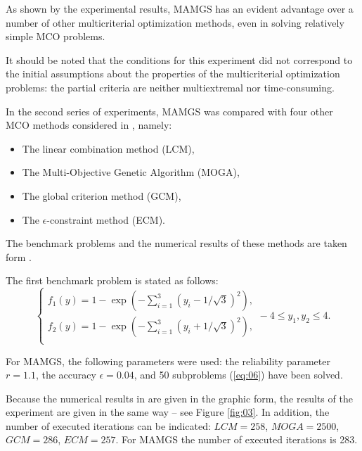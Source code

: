 \documentclass[smallcondensed]{svjour3}     %
\begin{document}
As shown by the experimental results, MAMGS has an evident advantage over a number of other multicriterial optimization methods, even in solving relatively simple MCO problems.\par

It should be noted that the conditions for this experiment did not correspond to the initial assumptions about the properties of the multicriterial optimization problems: the partial criteria are neither multiextremal nor time-consuming.\par

In the second series of experiments, MAMGS was compared with four other MCO methods considered in \cite{c50}, namely: 
\begin{itemize}
	\item The linear combination method (LCM),
	\item The Multi-Objective Genetic Algorithm (MOGA),
	\item The global criterion method (GCM),
	\item The $\epsilon$-constraint method (ECM).
\end{itemize}
	
The benchmark problems and the numerical results of these methods are taken form \cite{c50}.\par

The first benchmark problem is stated as follows:
\begin{equation}\label{eq:28}
 \begin{cases}
   f_1 (y)=1-\exp \left( -\sum_{i=1}^3{(y_i - 1/ \sqrt{3})^2} \right), \\
   f_2 (y)=1-\exp \left( -\sum_{i=1}^3{(y_i + 1/ \sqrt{3})^2} \right), \\
 \end{cases}
-4 \leq y_1,y_2 \leq 4.
\end{equation}

For MAMGS, the following parameters were used: the reliability parameter $r=1.1$, the accuracy $\epsilon = 0.04$, and 50 subproblems (\ref{eq:06}) have been solved. \par

Because the numerical results in \cite{c50} are given in the graphic form, the results of the experiment are given in the same way -- see Figure \ref{fig:03}. In addition, the number of executed iterations can be indicated: $LCM=258$, $MOGA=2500$, $GCM=286$, $ECM=257$. For MAMGS the number of executed iterations is 283.
\end{document}
